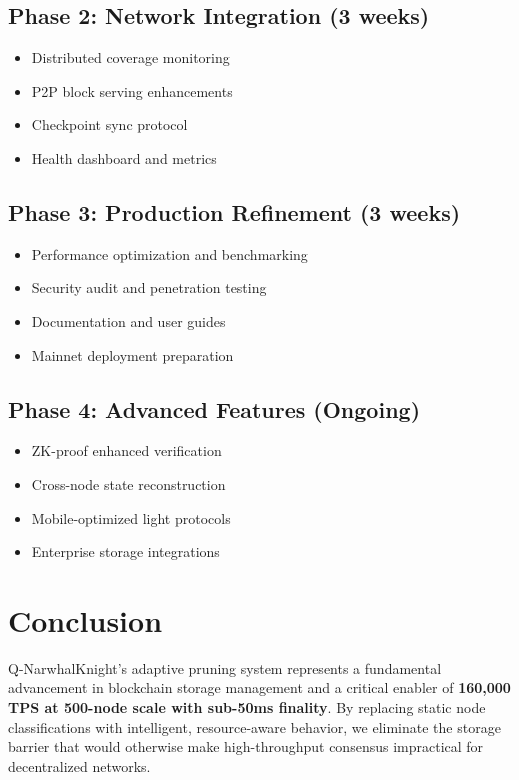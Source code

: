 \documentclass[11pt,a4paper]{article}
\begin{document}
\subsection{Phase 2: Network Integration (3 weeks)}
\begin{itemize}
\item Distributed coverage monitoring
\item P2P block serving enhancements
\item Checkpoint sync protocol
\item Health dashboard and metrics
\end{itemize}

\subsection{Phase 3: Production Refinement (3 weeks)}
\begin{itemize}
\item Performance optimization and benchmarking
\item Security audit and penetration testing
\item Documentation and user guides
\item Mainnet deployment preparation
\end{itemize}

\subsection{Phase 4: Advanced Features (Ongoing)}
\begin{itemize}
\item ZK-proof enhanced verification
\item Cross-node state reconstruction
\item Mobile-optimized light protocols
\item Enterprise storage integrations
\end{itemize}

\section{Conclusion}

Q-NarwhalKnight's adaptive pruning system represents a fundamental advancement in blockchain storage management and a critical enabler of \textbf{160,000 TPS at 500-node scale with sub-50ms finality}. By replacing static node classifications with intelligent, resource-aware behavior, we eliminate the storage barrier that would otherwise make high-throughput consensus impractical for decentralized networks.
\end{document}
